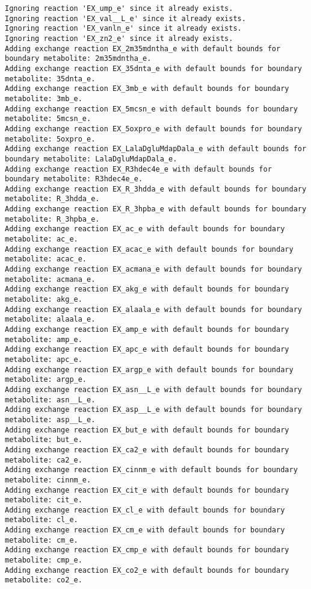 \documentclass[
  letterpaper,
  DIV=11,
  numbers=noendperiod]{scrartcl}
\begin{document}
\begin{verbatim}
Ignoring reaction 'EX_ump_e' since it already exists.
Ignoring reaction 'EX_val__L_e' since it already exists.
Ignoring reaction 'EX_vanln_e' since it already exists.
Ignoring reaction 'EX_zn2_e' since it already exists.
Adding exchange reaction EX_2m35mdntha_e with default bounds for boundary metabolite: 2m35mdntha_e.
Adding exchange reaction EX_35dnta_e with default bounds for boundary metabolite: 35dnta_e.
Adding exchange reaction EX_3mb_e with default bounds for boundary metabolite: 3mb_e.
Adding exchange reaction EX_5mcsn_e with default bounds for boundary metabolite: 5mcsn_e.
Adding exchange reaction EX_5oxpro_e with default bounds for boundary metabolite: 5oxpro_e.
Adding exchange reaction EX_LalaDgluMdapDala_e with default bounds for boundary metabolite: LalaDgluMdapDala_e.
Adding exchange reaction EX_R3hdec4e_e with default bounds for boundary metabolite: R3hdec4e_e.
Adding exchange reaction EX_R_3hdda_e with default bounds for boundary metabolite: R_3hdda_e.
Adding exchange reaction EX_R_3hpba_e with default bounds for boundary metabolite: R_3hpba_e.
Adding exchange reaction EX_ac_e with default bounds for boundary metabolite: ac_e.
Adding exchange reaction EX_acac_e with default bounds for boundary metabolite: acac_e.
Adding exchange reaction EX_acmana_e with default bounds for boundary metabolite: acmana_e.
Adding exchange reaction EX_akg_e with default bounds for boundary metabolite: akg_e.
Adding exchange reaction EX_alaala_e with default bounds for boundary metabolite: alaala_e.
Adding exchange reaction EX_amp_e with default bounds for boundary metabolite: amp_e.
Adding exchange reaction EX_apc_e with default bounds for boundary metabolite: apc_e.
Adding exchange reaction EX_argp_e with default bounds for boundary metabolite: argp_e.
Adding exchange reaction EX_asn__L_e with default bounds for boundary metabolite: asn__L_e.
Adding exchange reaction EX_asp__L_e with default bounds for boundary metabolite: asp__L_e.
Adding exchange reaction EX_but_e with default bounds for boundary metabolite: but_e.
Adding exchange reaction EX_ca2_e with default bounds for boundary metabolite: ca2_e.
Adding exchange reaction EX_cinnm_e with default bounds for boundary metabolite: cinnm_e.
Adding exchange reaction EX_cit_e with default bounds for boundary metabolite: cit_e.
Adding exchange reaction EX_cl_e with default bounds for boundary metabolite: cl_e.
Adding exchange reaction EX_cm_e with default bounds for boundary metabolite: cm_e.
Adding exchange reaction EX_cmp_e with default bounds for boundary metabolite: cmp_e.
Adding exchange reaction EX_co2_e with default bounds for boundary metabolite: co2_e.

\end{verbatim}
\end{document}
